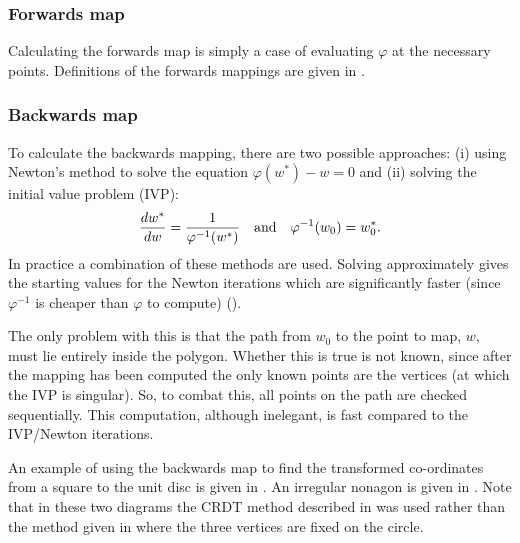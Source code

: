 \subsubsection{Forwards map}

Calculating the forwards map is simply a case of evaluating $\varphi$ at the necessary points. Definitions of the forwards mappings are given in .

\subsubsection{Backwards map}
\label{sc-backwardsmap}

To calculate the backwards mapping, there are two possible approaches: (i) using Newton's method to solve the equation $\varphi(w^*)-w=0$ and (ii) solving the initial value problem (IVP):
\begin{equation}
\label{scivp}
\frac{dw^*}{dw}=\frac{1}{\varphi^{-1}(w^*)} \quad \text{and} \quad \varphi^{-1}(w_0)=w^*_0.
\end{equation}
In practice a combination of these methods are used. Solving  approximately gives the starting values for the Newton iterations which are significantly faster (since $\varphi^{-1}$ is cheaper than $\varphi$ to compute) (\cite[p. 29]{driscoll}).

The only problem with this is that the path from $w_0$ to the point to map, $w$, must lie entirely inside the polygon. Whether this is true is not known, since after the mapping has been computed the only known points are the vertices (at which the IVP is singular). So, to combat this, all points on the path are checked sequentially. This computation, although inelegant, is fast compared to the IVP/Newton iterations.

An example of using the backwards map to find the transformed co-ordinates from a square to the unit disc is given in . An irregular nonagon is given in . Note that in these two diagrams the CRDT method described in  was used rather than the method given in  where the three vertices are fixed on the circle.


